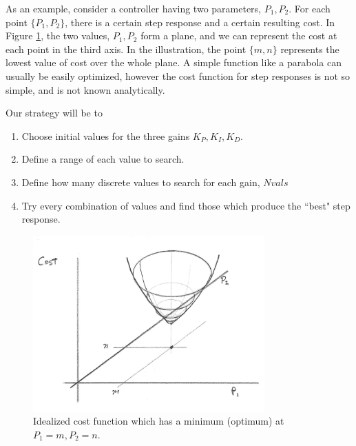 As an example, consider a controller having two parameters, $P_1, P_2$.  For each point $\{P_1 , P_2 \}$, there is a certain step response and a certain resulting cost.  In Figure \ref{CostFunc}, the two values, $P_1, P_2$ form a plane, and we can represent the cost at each point in the third axis.   In the illustration, the point $\{m,n\}$ represents the lowest value of cost over the whole plane.  A simple function like a parabola can usually be easily optimized, however the cost function for step responses is not so simple, and is not known analytically.

Our strategy will be to
\begin{enumerate}
  \item Choose initial values for the three gains $K_P, K_I, K_D$.
  \item Define a range of each value to search.
  \item Define how many discrete values to search for each gain, $Nvals$
  \item Try every combination of values and find those which produce the ``best" step response.
\end{enumerate}



\begin{figure}\centering
\includegraphics[width = 3.5in]{figs09/00648.png}
\caption{Idealized cost function which has a minimum (optimum) at $P_1=m, P_2=n$.}\label{CostFunc}
\end{figure}






